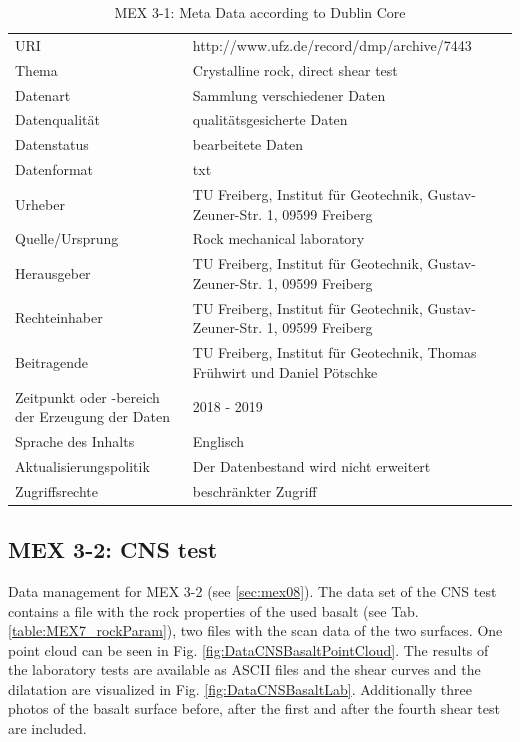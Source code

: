 \begin{table}[h!]
\caption{MEX 3-1: Meta Data according to Dublin Core}
\label{tab:}
\small
\begin{tabular}{R{3cm}|L{7cm}}
\hline
{}
%
URI & http://www.ufz.de/record/dmp/archive/7443 \\
Thema  & Crystalline rock, direct shear test \\
Datenart  & Sammlung verschiedener Daten \\
Datenqualität  & qualitätsgesicherte Daten \\
Datenstatus  & bearbeitete Daten \\
Datenformat  & txt \\
Urheber  & TU Freiberg, Institut für Geotechnik, Gustav-Zeuner-Str. 1, 09599 Freiberg \\
Quelle/Ursprung  & Rock mechanical laboratory \\
Herausgeber  & TU Freiberg, Institut für Geotechnik, Gustav-Zeuner-Str. 1, 09599 Freiberg \\
Rechteinhaber  & TU Freiberg, Institut für Geotechnik, Gustav-Zeuner-Str. 1, 09599 Freiberg \\
Beitragende  & TU Freiberg, Institut für Geotechnik, Thomas Frühwirt und Daniel Pötschke \\
Zeitpunkt oder -bereich der Erzeugung der Daten  & 2018 - 2019 \\
Sprache des Inhalts & Englisch \\
Aktualisierungspolitik  & Der Datenbestand wird nicht erweitert \\
Zugriffsrechte  & beschränkter Zugriff \\
%
\hline
\end{tabular}
\end{table}

\subsection{MEX 3-2: CNS test}\label{DataManMex3-2CNS}

Data management for MEX 3-2 (see \ref{sec:mex08}).
The data set of the CNS test contains a file with the rock properties of the used basalt (see Tab. \ref{table:MEX7_rockParam}), two files with the scan data of the two surfaces. One point cloud can be seen in Fig. \ref{fig:DataCNSBasaltPointCloud}. The results of the laboratory tests are available as ASCII files and the shear curves and the dilatation are visualized in Fig. \ref{fig:DataCNSBasaltLab}. Additionally three photos of the basalt surface before, after the first and after the fourth shear test are included. 


